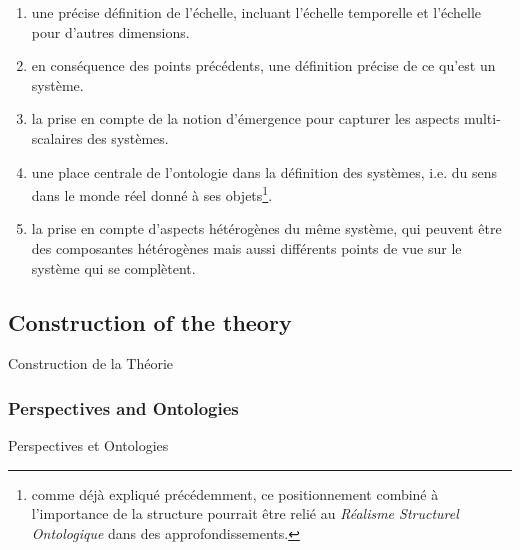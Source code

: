 {\begin{enumerate}
\item une précise définition de l'échelle, incluant l'échelle temporelle et l'échelle pour d'autres dimensions.
\item en conséquence des points précédents, une définition précise de ce qu'est un système.
\item la prise en compte de la notion d'émergence pour capturer les aspects multi-scalaires des systèmes.
\item une place centrale de l'ontologie dans la définition des systèmes, i.e. du sens dans le monde réel donné à ses objets\footnote{comme déjà expliqué précédemment, ce positionnement combiné à l'importance de la structure pourrait être relié au \emph{Réalisme Structurel Ontologique} dans des approfondissements.}.
\item la prise en compte d'aspects hétérogènes du même système, qui peuvent être des composantes hétérogènes mais aussi différents points de vue sur le système qui se complètent.
\end{enumerate}
}





\subsection{Construction of the theory}{Construction de la Théorie}


\subsubsection{Perspectives and Ontologies}{Perspectives et Ontologies}


